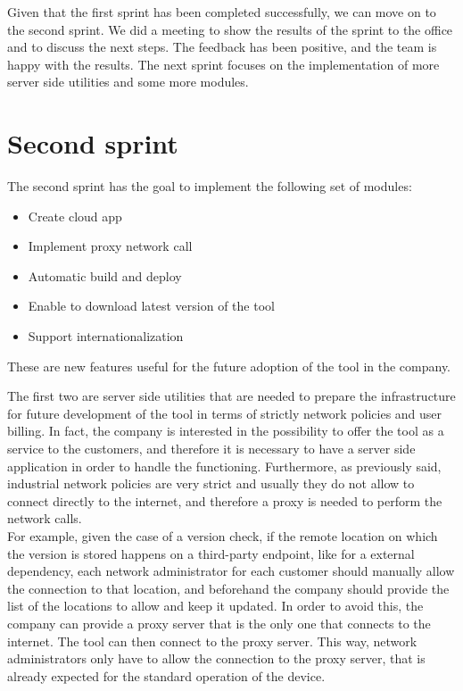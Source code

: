 Given that the first sprint has been completed successfully, we can move on to the second sprint. We did a meeting to show the results of the sprint to the office and to discuss the next steps. The feedback has been positive, and the team is happy with the results. The next sprint focuses on the implementation of more server side utilities and some more modules.

\section{Second sprint}

The second sprint has the goal to implement the following set of modules:

\begin{itemize}
  \item Create cloud app
  \item Implement proxy network call
  \item Automatic build and deploy
  \item Enable to download latest version of the tool
  \item Support internationalization
\end{itemize}

These are new features useful for the future adoption of the tool in the company.

The first two are server side utilities that are needed to prepare the infrastructure for future development of the tool in terms of strictly network policies and user billing. In fact, the company is interested in the possibility to offer the tool as a service to the customers, and therefore it is necessary to have a server side application in order to handle the functioning. Furthermore, as previously said, industrial network policies are very strict and usually they do not allow to connect directly to the internet, and therefore a proxy is needed to perform the network calls. \\
For example, given the case of a version check, if the remote location on which the version is stored happens on a third-party endpoint, like for a external dependency, each network administrator for each customer should manually allow the connection to that location, and beforehand the company should provide the list of the locations to allow and keep it updated. In order to avoid this, the company can provide a proxy server that is the only one that connects to the internet. The tool can then connect to the proxy server. This way, network administrators only have to allow the connection to the proxy server, that is already expected for the standard operation of the device.

